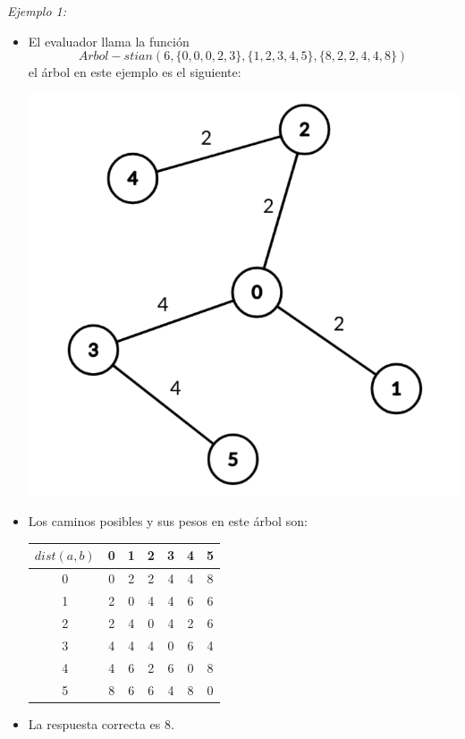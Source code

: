 \documentclass[12pt]{scrartcl}
\begin{document}
        {\itshape Ejemplo 1:}
        \begin{itemize}
            \item El evaluador llama la función $$Arbol-stian(6, \{0, 0, 0, 2, 3\}, \{1, 2, 3, 4, 5\}, \{8, 2, 2, 4, 4, 8\})$$ el árbol en este ejemplo es el siguiente:
            \begin{center}
                \includegraphics[scale=0.25]{ej1.png}
            \end{center}
            \item Los caminos posibles y sus pesos en este árbol son:
            \begin{center}
                \begin{tabular}{|c||c|c|c|c|c|c|}
                    \hline
                     $dist(a, b)$ & 0 & 1 & 2 & 3 & 4 & 5 \\
                     \hline
                     \hline
                     0 & 0 & 2 & 2 & 4 & 4 & 8 \\
                     \hline
                     1 & 2 & 0 & 4 & 4 & 6 & 6 \\
                     \hline
                     2 & 2 & 4 & 0 & 4 & 2 & 6 \\
                     \hline
                     3 & 4 & 4 & 4 & 0 & 6 & 4 \\
                     \hline
                     4 & 4 & 6 & 2 & 6 & 0 & 8 \\
                     \hline
                     5 & 8 & 6 & 6 & 4 & 8 & 0 \\ 
                     \hline
                \end{tabular}
            \end{center}
            \item La respuesta correcta es $8$.
        \end{itemize}
\end{document}
